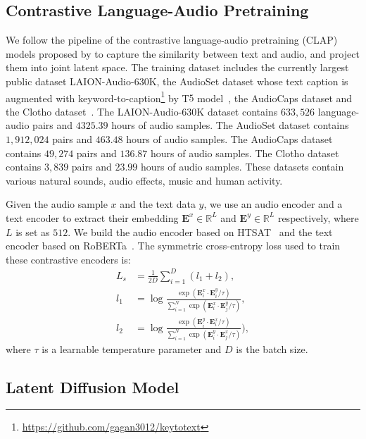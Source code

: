 \renewcommand{\thesubsection}{\Alph{subsection}}

\subsection{Contrastive Language-Audio Pretraining}
\label{app:CLAP}

We follow the pipeline of the contrastive language-audio pretraining (CLAP) models proposed by \cite{wu2022large} to capture the similarity between text and audio, and project them into joint latent space. The training dataset includes the currently largest public dataset LAION-Audio-$630$K, the AudioSet dataset whose text caption is augmented with keyword-to-caption\footnote{\url{https://github.com/gagan3012/keytotext}} by T$5$ model~\cite{T5}, the AudioCaps dataset and the Clotho dataset~\cite{Clotho}. The LAION-Audio-$630$K dataset contains $633,526$ language-audio pairs and $4325.39$ hours of audio samples. The AudioSet dataset contains $1,912,024$ pairs and $463.48$ hours of audio samples. The AudioCaps dataset contains $49,274$ pairs and $136.87$ hours of audio samples. The Clotho dataset contains $3,839$ pairs and $23.99$ hours of audio samples. These datasets contain various natural sounds, audio effects, music and human activity.

Given the audio sample $x$ and the text data $y$, we use an audio encoder and a text encoder to extract their embedding $\boldsymbol{E}^{x}\in \mathbb{R}^{L}$ and $\boldsymbol{E}^{y}\in \mathbb{R}^{L}$ respectively, where $L$ is set as $512$. We build the audio encoder based on HTSAT~\cite{HTSAT} and the text encoder based on RoBERTa~\cite{RoBERTa}. The symmetric cross-entropy loss used to train these contrastive encoders is:
\begin{align}
L_{s}&=\frac{1}{2D}\sum^{D}_{i=1}(l_{1} + l_{2}),\\
l_{1}&=\log\frac{\exp(\boldsymbol{E}^{x}_{i}\cdot \boldsymbol{E}^{y}_{i}/\tau)}{\sum^{N}_{i=1}\exp(\boldsymbol{E}^{x}_{i}\cdot \boldsymbol{E}^{y}_{j}/\tau)},\\
l_{2}&=\log\frac{\exp(\boldsymbol{E}^{y}_{i}\cdot \boldsymbol{E}^{x}_{i}/\tau)}{\sum^{N}_{i=1}\exp(\boldsymbol{E}^{y}_{i}\cdot \boldsymbol{E}^{x}_{j}/\tau)}),
\end{align}
where $\tau$ is a learnable temperature parameter and $D$ is the batch size. 

\subsection{Latent Diffusion Model}
\label{app:LDMArchitecture}

